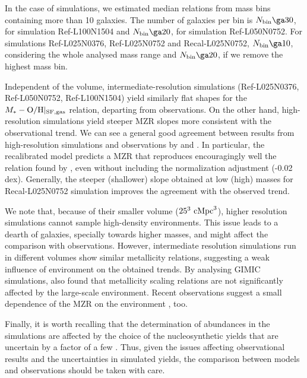 \documentclass[useAMS,usenatbib]{mn2e}
\begin{document}
In the case of simulations, we estimated median relations from mass bins containing more
than 10 galaxies. The number of galaxies per bin is $N_{\rm bin} \ga 30$, for simulation Ref-L100N1504 and
$N_{\rm bin} \ga 20$, for simulation Ref-L050N0752. 
For simulations Ref-L025N0376, Ref-L025N0752 and Recal-L025N0752, $N_{\rm bin} \ga 10$, considering
the whole analysed mass range and $N_{\rm bin} \ga 20$, if we remove the highest mass bin.


Independent of the volume, intermediate-resolution simulations (Ref-L025N0376, Ref-L050N0752, Ref-L100N1504)
yield similarly flat shapes for the $M_* - {\rm O/H}|_{\rm SF,gas}$ relation, departing from observations.  
On the other hand, high-resolution simulations yield steeper MZR slopes more consistent with the observational trend.  
We can see a general good agreement between results from high-resolution simulations and observations
by \citet{zahid2012} and \citet{salim2014}. 
In particular, the recalibrated model predicts a MZR that reproduces encouragingly well the
relation found by \citet{salim2014}, even without including the normalization adjustment (-0.02 dex).
Generally, the steeper (shallower) slope obtained at low (high) masses for Recal-L025N0752 simulation
improves the agreement with the observed trend.

We note that, because of their smaller volume ($25^3 \ {\rm cMpc}^3$), higher resolution simulations
cannot sample high-density environments.  This issue leads to a dearth
of galaxies, specially towards higher masses, and might affect the comparison with observations. 
However, intermediate resolution simulations run in different volumes 
show similar metallicity relations, suggesting a weak influence of environment on the obtained trends.
By analysing {\sc GIMIC} simulations, \citet{derossi2015} also found that metallicity scaling 
relations are not significantly affected by the large-scale environment.
Recent observations suggest a small dependence of the MZR on the environment \citep[e.g.][]{wu2017}, too.


Finally, it is worth recalling that the determination of abundances in the simulations are 
affected by the choice of the nucleosynthetic yields that are uncertain by a factor of a few
\citep{wiersma2009b}. Thus, given the issues affecting observational results and the uncertainties
in simulated yields, the comparison between models and observations should be taken with care.
\end{document}

